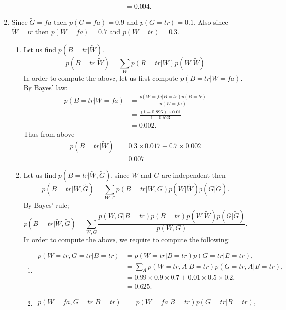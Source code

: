 \documentclass[11pt,a4paper,oneside]{report}
\begin{document}
\begin{enumerate}
\begin{enumerate}
\begin{align}
	&= 0.004.
	\end{align}
	\end{enumerate}
	\item Since $\tilde{G} = fa$ then $p(G=fa) = 0.9$ and  $p(G=tr) = 0.1$. Also since $\tilde{W} = tr$ then $p(W=fa) = 0.7$ and $p(W=tr)=0.3$.
	\begin{enumerate}
		\item Let us find $p(B=tr | \tilde{W})$.
		\begin{equation}
		p(B=tr | \tilde{W}) = \sum_{W} p(B= tr|W)p(W |\tilde{W})
		\end{equation}
		In order to compute the above, let us first compute $p(B=tr|W=fa)$. By Bayes' law:
		\begin{align}
		p(B=tr|W=fa) &= \frac{p(W=fa|B=tr)p(B=tr)}{p(W=fa)}\\
		&= \frac{(1-0.896)\times 0.01}{1-0.523}\\
		&= 0.002.
		\end{align}
		Thus from above
		\begin{align}
		p(B=tr | \tilde{W}) &= 0.3\times 0.017 + 0.7 \times 0.002\\
		&=0.007
		\end{align}
		\item
		Let us find $p(B=tr|\tilde{W},\tilde{G})$, since $W$ and $G$ are independent then
		\begin{equation}
		p(B=tr|\tilde{W},\tilde{G}) = \sum_{W,G} {p(B=tr|W,G) p(W|\tilde{W}) p(G|\tilde{G})}.
		\end{equation}
		By Bayes' rule;
		\begin{equation}
		p(B=tr|\tilde{W},\tilde{G}) = \sum_{W,G} \frac{p(W,G|B=tr) p(B=tr) p(W|\tilde{W}) p(G|\tilde{G})}{p(W,G)}.
		\end{equation}
		In order to compute the above, we require to compute the following:
		\begin{enumerate}
			\item
			\begin{align}
			p(W=tr, G=tr|B=tr) &= p(W=tr|B=tr)p(G=tr|B=tr),\\
			&= \sum_{A} p(W=tr, A|B=tr) p(G=tr, A|B=tr),\\
			&= 0.99 \times 0.9 \times 0.7 + 0.01 \times 0.5 \times 0.2,\\
			&= 0.625.
			\end{align}
			\item
			\begin{align}
			p(W=fa, G=tr|B=tr) &= p(W=fa|B=tr)p(G=tr|B=tr),\\

\end{align}
\end{enumerate}
\end{enumerate}
\end{enumerate}
\end{document}
